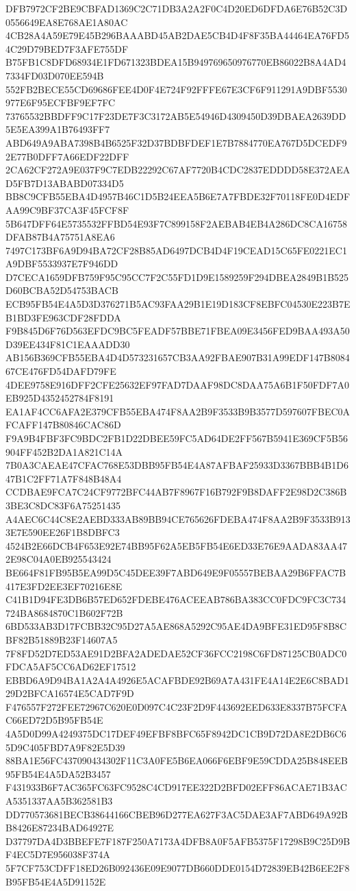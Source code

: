 {{DFB7972CF2BE9CBFAD1369C2C71DB3A2A2F0C4D20ED6DFDA6E76B52C3D0556649EA8E768AE1A80AC
4CB28A4A59E79E45B296BAAABD45AB2DAE5CB4D4F8F35BA44464EA76FD54C29D79BED7F3AFE755DF
B75FB1C8DFD68934E1FD671323BDEA15B949769650976770EB86022B8A4AD47334FD03D070EE594B
552FB2BECE55CD69686FEE4D0F4E724F92FFFE67E3CF6F911291A9DBF5530977E6F95ECFBF9EF7FC
73765532BBDFF9C17F23DE7F3C3172AB5E54946D4309450D39DBAEA2639DD5E5EA399A1B76493FF7
ABD649A9ABA7398B4B6525F32D37BDBFDEF1E7B7884770EA767D5DCEDF92E77B0DFF7A66EDF22DFF
2CA62CF272A9E037F9C7EDB22292C67AF7720B4CDC2837EDDDD58E372AEAD5FB7D13ABABD07334D5
BB8C9CFB55EBA4D4957B46C1D5B24EEA5B6E7A7FBDE32F70118FE0D4EDFAA99C9BF37CA3F45FCF8F
5B647DFF64E5735532FFBD54E93F7C899158F2AEBAB4EB4A286DC8CA16758DFAB87B4A75751A8EA6
7497C173BF6A9D94BA72CF28B85AD6497DCB4D4F19CEAD15C65FE0221EC1A9DBF5533937E7F946DD
D7CECA1659DFB759F95C95CC7F2C55FD1D9E1589259F294DBEA2849B1B525D60BCBA52D54753BACB
ECB95FB54E4A5D3D376271B5AC93FAA29B1E19D183CF8EBFC04530E223B7EB1BD3FE963CDF28FDDA
F9B845D6F76D563EFDC9BC5FEADF57BBE71FBEA09E3456FED9BAA493A50D39EE434F81C1EAAADD30
AB156B369CFB55EBA4D4D573231657CB3AA92FBAE907B31A99EDF147B808467CE476FD54DAFD79FE
4DEE9758E916DFF2CFE25632EF97FAD7DAAF98DC8DAA75A6B1F50FDF7A0EB925D4352452784F8191
EA1AF4CC6AFA2E379CFB55EBA474F8AA2B9F3533B9B3577D597607FBEC0AFCAFF147B80846CAC86D
F9A9B4FBF3FC9BDC2FB1D22DBEE59FC5AD64DE2FF567B5941E369CF5B56904FF452B2DA1A821C14A
7B0A3CAEAE47CFAC768E53DBB95FB54E4A87AFBAF25933D3367BBB4B1D647B1C2FF71A7F848B48A4
CCDBAE9FCA7C24CF9772BFC44AB7F8967F16B792F9B8DAFF2E98D2C386B3BE3C8DC83F6A75251435
A4AEC6C44C8E2AEBD333AB89BB94CE765626FDEBA474F8AA2B9F3533B9133E7E590EE26F1B8DBFC3
4524B2E66DCB4F653E92E74BB95F62A5EB5FB54E6ED33E76E9AADA83AA472E98C04A0EB925543424
BE664F81FB95B5EA99D5C45DEE39F7ABD649E9F05557BEBAA29B6FFAC7B417E3FD2EE3EF70216E8E
C41B1D94FE3DB6B57ED652FDEBE476ACEEAB786BA383CC0FDC9FC3C734724BA8684870C1B602F72B
6BD533AB3D17FCBB32C95D27A5AE868A5292C95AE4DA9BFE31ED95F8B8CBF82B51889B23F14607A5
7F8FD52D7ED53AE91D2BFA2ADEDAE52CF36FCC2198C6FD87125CB0ADC0FDCA5AF5CC6AD62EF17512
EBBD6A9D94BA1A2A4A4926E5ACAFBDE92B69A7A431FE4A14E2E6C8BAD129D2BFCA16574E5CAD7F9D
F476557F272FEE72967C620E0D097C4C23F2D9F443692EED633E8337B75FCFAC66ED72D5B95FB54E
4A5D0D99A4249375DC17DEF49EFBF8BFC65F8942DC1CB9D72DA8E2DB6C65D9C405FBD7A9F82E5D39
88BA1E56FC437090434302F11C3A0FE5B6EA066F6EBF9E59CDDA25B848EEB95FB54E4A5DA52B3457
F431933B6F7AC365FC63FC9528C4CD917EE322D2BFD02EFF86ACAE71B3ACA5351337AA5B362581B3
DD770573681BECB38644166CBEB96D277EA627F3AC5DAE3AF7ABD649A92BB8426E87234BAD64927E
D37797DA4D3BBEFE7F187F250A7173A4DFB8A0F5AFB5375F17298B9C25D9BF4EC5D7E956038F374A
5F7CF753CDFF18ED26B092436E09E9077DB660DDE0154D72839EB42B6EE2F8B95FB54E4A5D91152E
}}
